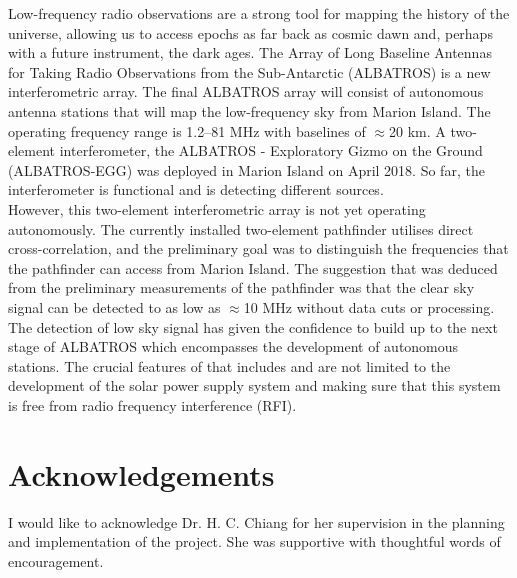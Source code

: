 \documentclass[12pt,a4paper]{report}
\begin{document}
Low-frequency radio observations are a strong tool for mapping the history of the universe, allowing us to access epochs as far back as cosmic dawn and, perhaps with a future instrument, the dark ages. The Array of Long Baseline Antennas for Taking Radio Observations from the Sub-Antarctic (ALBATROS) is a new interferometric array. The final ALBATROS array will consist of autonomous antenna stations that will map the low-frequency sky from Marion Island. The operating frequency range is 1.2–81 MHz with baselines of $\approx$20 km. A two-element interferometer, the ALBATROS - Exploratory Gizmo on the Ground (ALBATROS-EGG) was deployed in Marion Island on April 2018. So far, the interferometer is functional and is detecting different sources. \\

However, this two-element interferometric array is not yet operating autonomously. The currently installed two-element pathfinder utilises direct cross-correlation, and the preliminary goal was to distinguish the frequencies that the pathfinder can access from Marion Island. The suggestion that was deduced from the preliminary measurements of the pathfinder was that the clear sky signal can be detected to as low as $\approx$10 MHz without data cuts or processing.\\

The detection of low sky signal has given the confidence to build up to the next stage of ALBATROS which encompasses the development of autonomous stations. The crucial features of that includes and are not limited to the development of the solar power supply system and making sure that this system is free from radio frequency interference (RFI).

\begin{center}
\listoffigures %
\end{center}


\begin{center}
\listoftables %
\end{center}


\newpage
\section*{Acknowledgements}
I would like to acknowledge Dr. H. C. Chiang for her supervision in the planning and implementation of the project. She was supportive with thoughtful words of encouragement.\\
\end{document}
